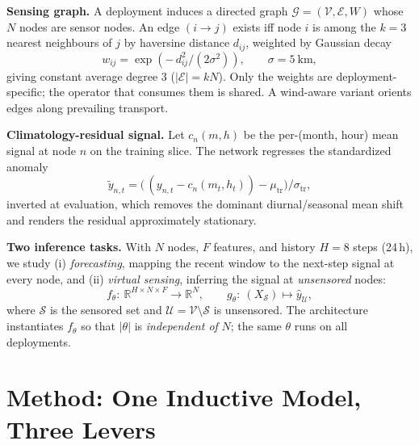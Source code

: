 \documentclass[journal]{IEEEtran}
\begin{document}
\textbf{Sensing graph.} A deployment induces a directed graph $\mathcal{G}=(\mathcal{V},\mathcal{E},W)$ whose $N$ nodes are sensor nodes. An edge $(i\!\rightarrow\!j)$ exists iff node $i$ is among the $k{=}3$ nearest neighbours of $j$ by haversine distance $d_{ij}$, weighted by Gaussian decay
\begin{equation}
w_{ij}=\exp\!\left(-\,d_{ij}^{2}/(2\sigma^{2})\right),\qquad \sigma=5~\text{km},
\label{eq:edge}
\end{equation}
giving constant average degree 3 ($|\mathcal{E}|=kN$). Only the weights are deployment-specific; the operator that consumes them is shared. A wind-aware variant orients edges along prevailing transport.

\textbf{Climatology-residual signal.} Let $c_n(m,h)$ be the per-(month, hour) mean signal at node $n$ on the training slice. The network regresses the standardized anomaly
\begin{equation}
\tilde{y}_{n,t}=\big(\,(y_{n,t}-c_n(m_t,h_t))-\mu_{\mathrm{tr}}\big)/\sigma_{\mathrm{tr}},
\label{eq:resid}
\end{equation}
inverted at evaluation, which removes the dominant diurnal/seasonal mean shift and renders the residual approximately stationary.

\textbf{Two inference tasks.} With $N$ nodes, $F$ features, and history $H{=}8$ steps (24\,h), we study (i) \emph{forecasting}, mapping the recent window to the next-step signal at every node, and (ii) \emph{virtual sensing}, inferring the signal at \emph{unsensored} nodes:
\begin{equation}
f_{\theta}:\ \mathbb{R}^{H\times N\times F}\rightarrow\mathbb{R}^{N},
\qquad
g_{\theta}:\ (X_{\mathcal{S}})\mapsto \hat{y}_{\mathcal{U}},
\label{eq:tasks}
\end{equation}
where $\mathcal{S}$ is the sensored set and $\mathcal{U}=\mathcal{V}\setminus\mathcal{S}$ is unsensored. The architecture instantiates $f_\theta$ so that $|\theta|$ is \emph{independent of} $N$; the same $\theta$ runs on all deployments.

\section{Method: One Inductive Model, Three Levers}\label{sec:method}
\end{document}
